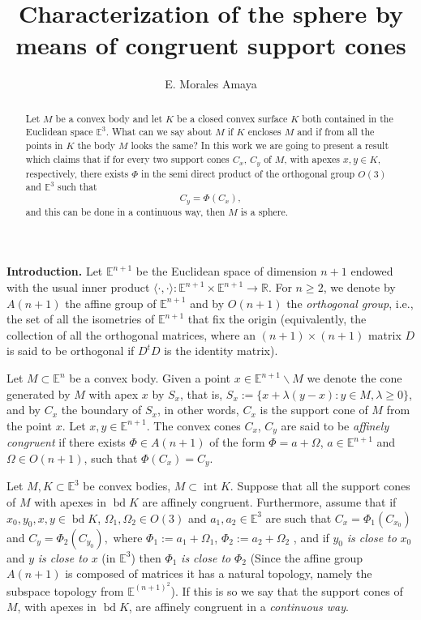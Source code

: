 \documentclass[12pt]{amsart}
\title{Characterization of the sphere by means of congruent support cones}
\author{E. Morales Amaya}
\newcommand{\inte}{\operatorname*{int}}
\newcommand{\bd}{\operatorname*{bd}}
\begin{document}
 
\begin{abstract}
Let $M$ be a convex body and let $K$ be a closed convex surface $K$ both contained in the Euclidean space $\mathbb{E}^3$. What can we say about $M$ if $K$ encloses $M$ and if from all the points in $K$ the body $M$ looks the same? In this work we are going to present a result which claims that if for every two support cones $C_x$, $C_y$ of $M$, with apexes $x,y \in  K$, respectively, there exists $\Phi$  in the  semi direct product of the orthogonal group $O(3)$ and $\mathbb{E}^3$ such that
$$C_y=\Phi(C_x),$$
and this can be done in a continuous way, then $M$ is a sphere.
\end{abstract}
\maketitle
\textbf{Introduction.} 
Let $\mathbb{E}^{n+1}$ be the Euclidean space of dimension $n+1$ endowed with the usual inner pro\-duct $\langle \cdot, \cdot\rangle : \mathbb{E}^{n+1} \times \mathbb{E}^{n+1} \rightarrow \mathbb{R}$.  
For $n \geq 2$, we denote by $A(n+1)$ the affine group of $\mathbb{E}^{n+1}$ and by $O(n+1)$ the \textit{orthogonal group}, i.e., the set of all the isometries of $\mathbb{E}^{n+1}$ that fix the origin (equivalently, the collection of all the orthogonal matrices, where an $(n+1)\times (n+1)$ matrix  $D$ is said to be orthogonal if $D^{t}D$ is the identity matrix).  
    
Let $M\subset \mathbb{E}^{n}$ be a convex body. Given a point $x \in \mathbb{E}^{n+1} \backslash M$ we denote the cone generated by $M$ with apex $x$ by $S_x$, that is, $S_x := \{x + \lambda(y - x) : y \in M, \lambda \geq  0\}$, and by $C_x$ the boundary of $S_x$, in other words, $C_x$ is the support cone of $M$ from the point $x$. Let $x,y\in \mathbb{E}^{n+1}$. The convex cones $C_x$, $C_y$ are said to be \textit{affinely congruent} if there exists $\Phi \in A(n+1)$ of the form $\Phi=a+\Omega$, $a\in \mathbb{E}^{n+1}$ and $\Omega \in O(n+1)$, such that $\Phi(C_x)=C_y$.   

Let $M,K\subset \mathbb{E}^{3}$ be convex bodies, $M\subset \inte K$. Suppose that all the support cones of $M$ with apexes in $\bd K$ are affinely congruent. Furthermore, assume that if $x_0,y_0,x,y\in \bd K$,   $\Omega_1, \Omega_2\in O(3)$ and $a_1,a_2\in \mathbb{E}^{3}$ are such that $C_x=\Phi_1(C_{x_0})$ and $C_y=\Phi_2(C_{y_0}),$
where $\Phi_1:=a_1+\Omega_1$, $\Phi_2:=a_2+\Omega_2$ , and if $y_0$ \textit{is close to} $x_0$ and $y$ \textit{is close to} $x$ (in $\mathbb{E}^3$) then $\Phi_1$ \textit{is close to} $\Phi_2$ (Since the affine group $A(n+1)$ is composed of matrices it has a natural topology, namely the subspace topology from $\mathbb{E}^{(n+1)^2}$). If this is so we say that the support cones of $M$, with apexes in $\bd K$, are affinely congruent in a \textit{continuous way}.
\end{document}
